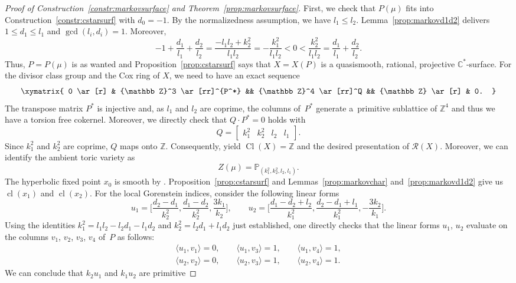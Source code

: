 \documentclass[10pt,a4paper]{amsart}
\theoremstyle{definition}
\def\CC{{\mathbb C}}
\def\ZZ{{\mathbb Z}}
\def\PP{{\mathbb P}}
\DeclareMathOperator{\Cl}{Cl}
\DeclareMathOperator{\cl}{cl}
\def\bangle#1{{\langle #1 \rangle}}
\begin{document}
\begin{proof}[Proof of Construction~\ref{constr:markovsurface}
and Theorem~\ref{prop:markovsurface}]
First, we check that $P(\mu)$ fits into
Construction~\ref{constr:cstarsurf} with $d_0=-1$.
By the normalizedness assumption, we have $l_1 \le l_2$.
Lemma~\ref{prop:markovd1d2} delivers $1 \le d_1 \le l_1$
and $\gcd(l_i,d_i)=1$. Moreover,
\[
-1 + \frac{d_1}{l_1} + \frac{d_2}{l_2}
 =
\frac{-l_1l_2 + k_2^2}{l_1l_2}
 =
-\frac{k_1^2}{l_1l_2}
 <
0
 <
\frac{k_2^2}{l_1l_2}
 =
\frac{d_1}{l_1} + \frac{d_2}{l_2}.
\]
Thus, $P = P(\mu)$ is as wanted and
Proposition~\ref{prop:cstarsurf} says that
$X=X(P)$ is a quasismooth, rational,
projective $\CC^*$-surface.
For the divisor class group and the Cox ring of $X$,
we need to have an exact sequence
\[
\xymatrix{
0
\ar[r]
&
\ZZ^3
\ar[rr]^{P^*}
&&
\ZZ^4
\ar[rr]^Q
&&
\ZZ
\ar[r]
&
0.
}
\]
The transpose matrix $P^*$ is injective
and, as $l_1$ and $l_2$ are coprime,
the columns of~$P^*$ generate a~primitive
sublattice of $\ZZ^4$ and thus we have
a torsion free cokernel.
Moreover, we directly check that
$Q \cdot P^* = 0$ holds with
\[
Q = \begin{bmatrix} k_1^2 & k_2^2 & l_2 & l_1 \end{bmatrix}.
\]
Since $k_1^2$ and $k_2^2$ are coprime, $Q$ maps onto $\ZZ$.
Consequently, \cite[Propositions~4.13 and~4.16]{HaHaHaSp} yield
$\Cl(X) = \ZZ$ and the desired presentation of $\mathcal{R}(X)$.
Moreover, we can identify the ambient toric variety as
\[
Z(\mu) = \PP_{(k_1^2, k_2^2, l_2, l_1)}.
\]
The hyperbolic fixed point $x_0$ is smooth by
\cite[Proposition~5.1]{HaHaHaSp}.
Proposition~\ref{prop:cstarsurf} and
Lemmas~\ref{prop:markovchar} and~\ref{prop:markovd1d2}
give us $\cl(x_1)$ and $\cl(x_2)$.
For the local Gorenstein indices, consider
the following linear forms
\[
u_1 = \biggl[\frac{d_2-d_1}{k_2^2}, \frac{d_1-d_2}{k_2^2}, \frac{3k_1}{k_2} \biggr],
\qquad
u_2 = \biggl[\frac{d_1-d_2+l_2}{k_1^2}, \frac{d_2-d_1+l_1}{k_1^2}, - \frac{3k_2}{k_1} \biggr].
\]
Using the identities $k_1^2 = l_1l_2-l_2d_1-l_1d_2$ and $k_2^2 = l_2d_1+l_1d_2$
just established, one directly checks that the linear forms $u_1$, $u_2$ evaluate
on the columns $v_1$, $v_2$, $v_3$, $v_4$ of~$P$ as follows:
\begin{gather*}
\bangle{u_1,v_1} = 0, \qquad
\bangle{u_1,v_3}
= 1, \qquad
\bangle{u_1,v_4}
= 1,
\\
\bangle{u_2,v_2} = 0, \qquad
\bangle{u_2,v_3}
= 1, \qquad
\bangle{u_2,v_4}
= 1.
\end{gather*}
We can conclude that $k_2u_1$ and $k_1u_2$ are primitive

\end{proof}
\end{document}
